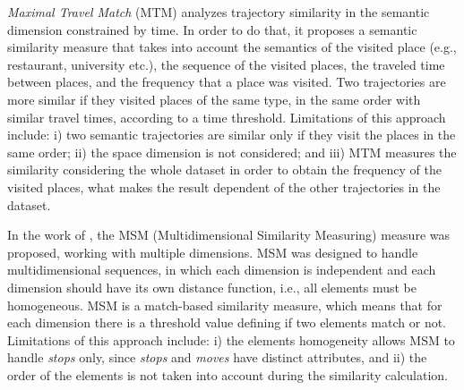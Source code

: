 \documentclass[12pt]{article}
\begin{document}

\emph{Maximal Travel Match} (MTM)\cite{Xiao:2010:FSU:1869790.1869857} analyzes trajectory similarity in the semantic dimension constrained by time. In order to do that, it proposes a semantic similarity measure that takes into account the semantics of the visited place (e.g., restaurant, university etc.), the sequence of the visited places, the traveled time between places, and the frequency that a place was visited. Two trajectories are more similar if they visited places of the same type, in the same order with similar travel times, according to a time threshold. Limitations of this approach include: i) two semantic trajectories are similar only if they visit the places in the same order; ii) the space dimension is not considered; and iii) MTM measures the similarity considering the whole dataset in order to obtain the frequency of the visited places, what makes the result dependent of the other trajectories in the dataset.


In the work of \cite{Furtado:TGIS12156}, the MSM (Multidimensional Similarity Measuring) measure was proposed, working with multiple dimensions. MSM was designed to handle multidimensional sequences, in which each dimension is independent and each dimension should have its own distance function, i.e., all elements must be homogeneous. MSM is a match-based similarity measure, which means that for each dimension there is a threshold value defining if two elements match or not. Limitations of this approach include: i) the elements homogeneity allows MSM to handle \textit{stops} only, since \textit{stops} and \textit{moves} have distinct attributes, and ii) the order of the elements is not taken into account during the similarity calculation.
\end{document}
